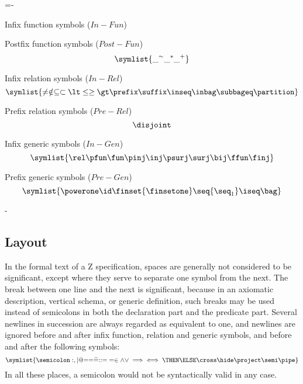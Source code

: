\begin{list}{}{ \itemindent=-\leftmargin
	\def\makelabel#1{\hspace\labelsep \em #1}}
\zedindent=0pt
\item[Infix function symbols \rm (\(In-Fun\))]%
	\label{p:stdsym}
\begin{display}
    \jot
\end{display}

\item[Postfix function symbols \rm (\(Post-Fun\))]
    \[\symlist{{\_^\sim} {\_^*} {\_^+}}\]

\item[Infix relation symbols \rm (\(In-Rel\))]
    \[\symlist{\neq \notin \subseteq \subset \lt \leq \geq \gt
		\prefix \suffix \inseq \inbag \subbageq \partition}\]

\item[Prefix relation symbols \rm (\(Pre-Rel\))]
    \[\disjoint\]

\item[Infix generic symbols \rm (\(In-Gen\))]
    \[\symlist{\rel \pfun \fun \pinj \inj \psurj \surj \bij \ffun \finj}\]

\item[Prefix generic symbols \rm (\(Pre-Gen\))]%
    \[\symlist{{\powerone} \id \finset {\finsetone} 
		\seq {\seq_1} \iseq \bag}\]
\end{list}

\kern-\baselineskip

\subsection{Layout}\label{ss:layout}

In the formal text of a Z specification, spaces are generally not considered to be significant, except
where they serve to separate one symbol from the next.  The break
between one line and the next is significant, because in an
axiomatic description, vertical schema, or generic definition, such
breaks may be used instead of semicolons in both the declaration part and the predicate part. Several
newlines in succession are always regarded as
equivalent to one, and newlines are ignored before and after infix
function, relation and generic symbols, and before and after the
following symbols:
\[
    \symlist{\semicolon : , | @ {==} {\widehat=} {::=}
		= \in \land \lor \implies \iff \THEN \ELSE \cross %
		\hide \project \semi \pipe}
\]
In all these places, a semicolon would not be syntactically valid
in any case.

